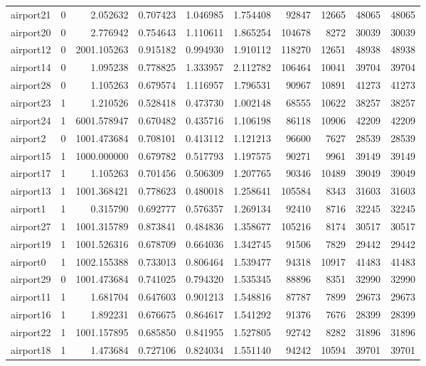\begin{longtable}{|l|r|r|r|r|r|r|r|r|r|}
airport21 & 0 & 2.052632 & 0.707423 & 1.046985 & 1.754408 & 92847 & 12665 & 48065 & 48065 \\
airport20 & 0 & 2.776942 & 0.754643 & 1.110611 & 1.865254 & 104678 & 8272 & 30039 & 30039 \\
airport12 & 0 & 2001.105263 & 0.915182 & 0.994930 & 1.910112 & 118270 & 12651 & 48938 & 48938 \\
airport14 & 0 & 1.095238 & 0.778825 & 1.333957 & 2.112782 & 106464 & 10041 & 39704 & 39704 \\
airport28 & 0 & 1.105263 & 0.679574 & 1.116957 & 1.796531 & 90967 & 10891 & 41273 & 41273 \\
airport23 & 1 & 1.210526 & 0.528418 & 0.473730 & 1.002148 & 68555 & 10622 & 38257 & 38257 \\
airport24 & 1 & 6001.578947 & 0.670482 & 0.435716 & 1.106198 & 86118 & 10906 & 42209 & 42209 \\
airport2 & 0 & 1001.473684 & 0.708101 & 0.413112 & 1.121213 & 96600 & 7627 & 28539 & 28539 \\
airport15 & 1 & 1000.000000 & 0.679782 & 0.517793 & 1.197575 & 90271 & 9961 & 39149 & 39149 \\
airport17 & 1 & 1.105263 & 0.701456 & 0.506309 & 1.207765 & 90346 & 10489 & 39049 & 39049 \\
airport13 & 1 & 1001.368421 & 0.778623 & 0.480018 & 1.258641 & 105584 & 8343 & 31603 & 31603 \\
airport1 & 1 & 0.315790 & 0.692777 & 0.576357 & 1.269134 & 92410 & 8716 & 32245 & 32245 \\
airport27 & 1 & 1001.315789 & 0.873841 & 0.484836 & 1.358677 & 105216 & 8174 & 30517 & 30517 \\
airport19 & 1 & 1001.526316 & 0.678709 & 0.664036 & 1.342745 & 91506 & 7829 & 29442 & 29442 \\
airport0 & 1 & 1002.155388 & 0.733013 & 0.806464 & 1.539477 & 94318 & 10917 & 41483 & 41483 \\
airport29 & 0 & 1001.473684 & 0.741025 & 0.794320 & 1.535345 & 88896 & 8351 & 32990 & 32990 \\
airport11 & 1 & 1.681704 & 0.647603 & 0.901213 & 1.548816 & 87787 & 7899 & 29673 & 29673 \\
airport16 & 1 & 1.892231 & 0.676675 & 0.864617 & 1.541292 & 91376 & 7676 & 28399 & 28399 \\
airport22 & 1 & 1001.157895 & 0.685850 & 0.841955 & 1.527805 & 92742 & 8282 & 31896 & 31896 \\
airport18 & 1 & 1.473684 & 0.727106 & 0.824034 & 1.551140 & 94242 & 10594 & 39701 & 39701 \\

\end{longtable}
